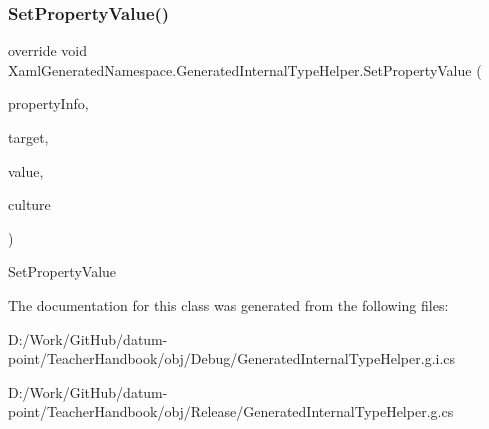 \subsubsection{\texorpdfstring{Set\+Property\+Value()}{SetPropertyValue()}\hspace{0.1cm}{\footnotesize\ttfamily [3/3]}}
{\footnotesize\ttfamily override void Xaml\+Generated\+Namespace.\+Generated\+Internal\+Type\+Helper.\+Set\+Property\+Value (\begin{DoxyParamCaption}\item[{System.\+Reflection.\+Property\+Info}]{property\+Info,  }\item[{object}]{target,  }\item[{object}]{value,  }\item[{System.\+Globalization.\+Culture\+Info}]{culture }\end{DoxyParamCaption})\hspace{0.3cm}{\ttfamily [protected]}}



Set\+Property\+Value 



The documentation for this class was generated from the following files\+:\begin{DoxyCompactItemize}
\item 
D\+:/\+Work/\+Git\+Hub/datum-\/point/\+Teacher\+Handbook/obj/\+Debug/Generated\+Internal\+Type\+Helper.\+g.\+i.\+cs\item 
D\+:/\+Work/\+Git\+Hub/datum-\/point/\+Teacher\+Handbook/obj/\+Release/Generated\+Internal\+Type\+Helper.\+g.\+cs\end{DoxyCompactItemize}

